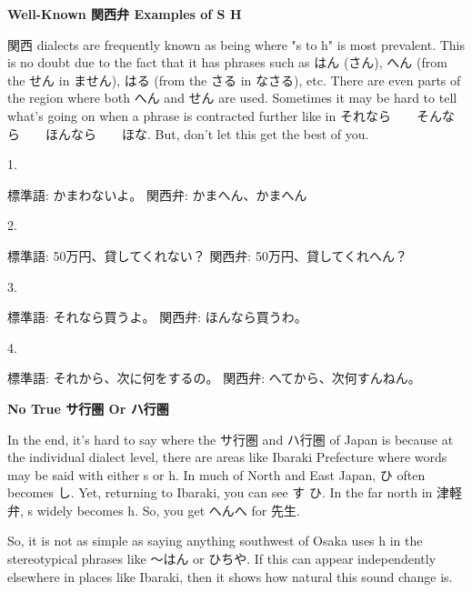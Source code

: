 \begin{center}
 \textbf{Well-Known 関西弁 Examples of S \textrightarrow  H }
\end{center}

\par{ 関西 dialects are frequently known as being where "s to h" is most prevalent. This is no doubt due to the fact that it has phrases such as はん (\textrightarrow  さん), へん (from the せん in ません), はる (from the さる in なさる), etc. There are even parts of the region where both へん and せん are used. Sometimes it may be hard to tell what's going on when a phrase is contracted further like in それなら　\textrightarrow 　そんなら　\textrightarrow 　ほんなら　\textrightarrow 　ほな. But, don't let this get the best of you. }

\par{1. }

\par{標準語: かまわないよ。 \hfill\break
関西弁: かまへん、かまへん }

\par{2. }

\par{標準語: 50万円、貸してくれない？ \hfill\break
関西弁: 50万円、貸してくれへん？ }

\par{3. }

\par{標準語: それなら買うよ。 \hfill\break
関西弁: ほんなら買うわ。 }

\par{4. }

\par{標準語: それから、次に何をするの。 \hfill\break
関西弁: へてから、次何すんねん。 }

\begin{center}
 \textbf{No True サ行圏 Or ハ行圏 }
\end{center}

\par{ In the end, it's hard to say where the サ行圏 and ハ行圏 of Japan is because at the individual dialect level, there are areas like Ibaraki Prefecture where words may be said with either s or h. In much of North and East Japan, ひ often becomes し. Yet, returning to Ibaraki, you can see す \textrightarrow  ひ. In the far north in 津軽弁, s widely becomes h. So, you get へんへ for 先生. }

\par{ So, it is not as simple as saying anything southwest of Osaka uses h in the stereotypical phrases like ～はん or ひちや. If this can appear independently elsewhere in places like Ibaraki, then it shows how natural this sound change is. }

